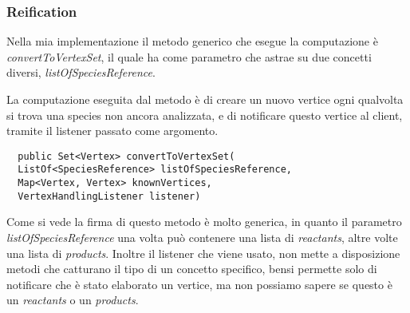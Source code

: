 \subsubsection*{Reification}
Nella mia implementazione il metodo generico che esegue la
computazione \`e \emph{convertToVertexSet}, il quale ha come parametro
che astrae su due concetti diversi, \emph{listOfSpeciesReference}. 

La computazione eseguita dal metodo \`e di creare un nuovo vertice
ogni qualvolta si trova una species non ancora analizzata, e di
notificare questo vertice al client, tramite il listener passato come
argomento.

\begin{lstlisting}
  public Set<Vertex> convertToVertexSet( 
  ListOf<SpeciesReference> listOfSpeciesReference, 
  Map<Vertex, Vertex> knownVertices,
  VertexHandlingListener listener) 
\end{lstlisting}
Come si vede la firma di questo metodo \`e molto generica, in quanto
il parametro \emph{listOfSpeciesReference} una volta pu\`o contenere
una lista di \emph{reactants}, altre volte una lista di
\emph{products}. Inoltre il listener che viene usato, non mette a
disposizione metodi che catturano il tipo di un concetto specifico,
bensi permette solo di notificare che \`e stato elaborato un vertice,
ma non possiamo sapere se questo \`e un \emph{reactants} o un
\emph{products}.

